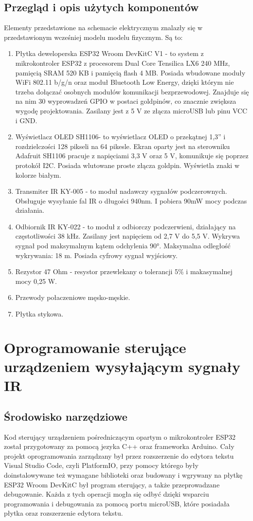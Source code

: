 \documentclass[12pt,twoside]{article}
\begin{document}
\subsection{Przegląd i opis użytych komponentów}
Elementy przedstawione na schemacie elektrycznym znalazły się w przedstawionym wcześniej modelu modelu fizycznym. Są to:
\begin{enumerate}[label=\alph*), leftmargin=1.25cm]
   \item Płytka deweloperska ESP32 Wroom DevKitC V1\cite{doitDevKitV1} - to system z mikrokontroler ESP32 z procesorem Dual Core Tensilica LX6 240 MHz, pamięcią SRAM 520 KB i pamięcią flash 4 MB. Posiada wbudowane moduły WiFi 802.11 b/g/n oraz moduł Bluetooth Low Energy, dzięki którym nie trzeba dołączać osobnych modułów komunikacji bezprzewodowej. Znajduje się na nim 30 wyprowadzeń GPIO w postaci goldpinów, co znacznie zwiększa wygodę projektowania. Zasilany jest z 5 V ze złącza microUSB lub pinu VCC i GND.
   \item Wyświetlacz OLED SH1106\cite{sh1106}- to wyświetlacz OLED o przekątnej 1,3'' i rozdzielczości 128 pikseli na 64 pikesle. Ekran oparty jest na sterowniku Adafruit SH1106 pracuje z napięciami 3,3 V oraz 5 V, komunikuje się poprzez protokół I2C. Posiada wlutowane proste złącza goldpin. Wyświetla znaki w kolorze białym.
   \item Transmiter IR KY-005\cite{ky005} - to moduł nadawczy sygnałów podczerownych. Obsługuje wysyłanie fal IR o długości 940nm. I pobiera 90mW mocy podczas działania.
   \item Odbiornik IR KY-022\cite{ky022}  - to moduł z odbiorczy podczerwieni, działający na częstotliwości 38 kHz. Zasilany jest napięciem od 2,7 V do 5,5 V. Wykrywa sygnał pod maksymalnym kątem odchylenia 90°. Maksymalna odległość wykrywania: 18 m. Posiada cyfrowy sygnał wyjściowy.
   \item Rezystor 47 Ohm - resystor przewlekany o tolerancji 5\% i makasymalnej mocy 0,25 W.
   \item Przewody połaczeniowe męsko-męskie.
   \item Płytka stykowa.
\end{enumerate}

\clearpage

\section{Oprogramowanie sterujące urządzeniem wysyłającym sygnały IR}
\subsection{Środowisko narzędziowe}
Kod sterujący urządzeniem pośredniczącym opartym o mikrokontroler ESP32 został przygotowany za pomocą jezyka C++ oraz frameworka Arduino. Cały projekt oprogramowania zarządzany był przez rozszerzenie do edytora tekstu Visual Studio Code, czyli PlatformIO, przy pomocy którego były doinstalowywane też wymagane biblioteki oraz budowany i wgrywany na płytkę ESP32 Wroom DevKitC był program sterujący, a także przeprowadzane debugowanie. Każda z tych operacji mogła się odbyć dzięki wsparciu programowania i debugowania za pomocą portu microUSB, które posiadała płytka oraz rozszerzenie edytora tekstu.
\end{document}

